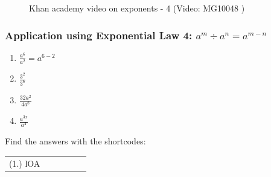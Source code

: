 \label{m38359*eip-693}
    \setcounter{subfigure}{0}
	\begin{figure}[H] %
    \textnormal{Khan academy video on exponents - 4}\vspace{.1in} \nopagebreak
  \label{m38359*yt-media6}\label{m38359*yt-video6}
             { (Video:  MG10048 )}
      \vspace{2pt}
    \vspace{.1in}
 \end{figure}       \par \label{m38359*secfhsst!!!underscore!!!id1192}
            \subsubsection{ Application using Exponential Law 4: ${a}^{m}÷{a}^{n}={a}^{m-n}$}
            \nopagebreak
        \label{m38359*id65493}\begin{enumerate}[noitemsep, label=\textbf{\arabic*}. ] 
            \label{m38359*uid25}\item 
            \begin{math}\frac{{a}^{6}}{{a}^{2}}={a}^{6-2}\end{math}
      \label{m38359*uid26}\item 
        \begin{math}\frac{{3}^{2}}{{3}^{6}}\end{math}
      \label{m38359*uid27}\item 
        \begin{math}\frac{32{a}^{2}}{4{a}^{8}}\end{math}
      \label{m38359*uid28}\item 
        \begin{math}\frac{{a}^{3x}}{{a}^{4}}\end{math}
\newline
\newline
          \end{enumerate}
      \label{m38359*uid29}
\par {} Find the answers with the shortcodes:
 \par \begin{tabular}[h]{cccccc}
 (1.) lOA  & \end{tabular}
